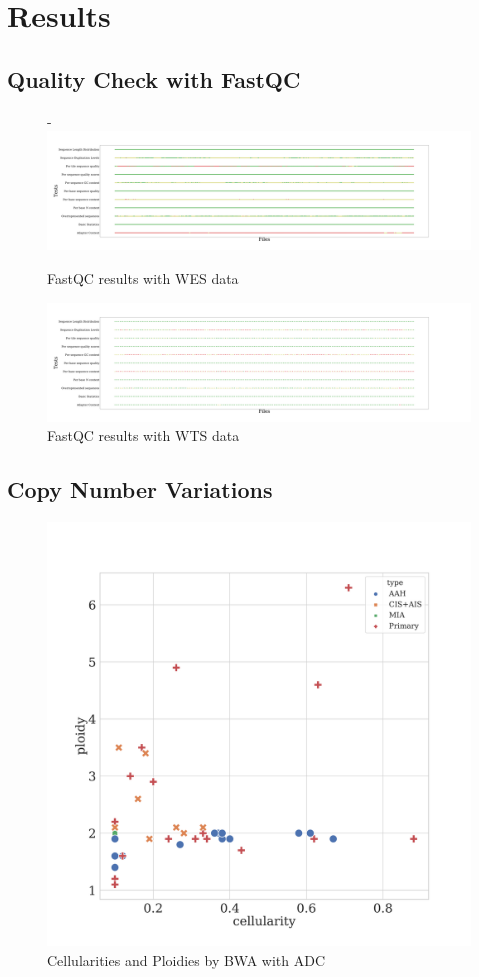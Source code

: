 \documentclass[a4paper]{article}
\begin{document}
    \section{Results}
        \subsection{Quality Check with FastQC}

            \begin{figure}[htbp]
                \centering-
               \includegraphics[width=0.8 \linewidth]{figures/FastQC/FastQC_WES.pdf}
                \caption{FastQC results with WES data}
                \label{fig:fastqc-WES}
            \end{figure}

            \begin{figure}[htbp]
                \centering
                \includegraphics[width=0.8 \linewidth]{figures/FastQC/FastQC_WTS.pdf}
                \caption{FastQC results with WTS data}
                \label{fig:fastqc-WTS}
            \end{figure}

        \subsection{Copy Number Variations}

            \begin{figure}[htbp]
                \centering
                \includegraphics[width=0.6 \linewidth]{figures/Sequenza/BWA-sequenza-ADC.pdf}
                \caption{Cellularities and Ploidies by BWA with ADC}
                \label{fig:sequenza-BWA-ADC}
            \end{figure}
\end{document}
